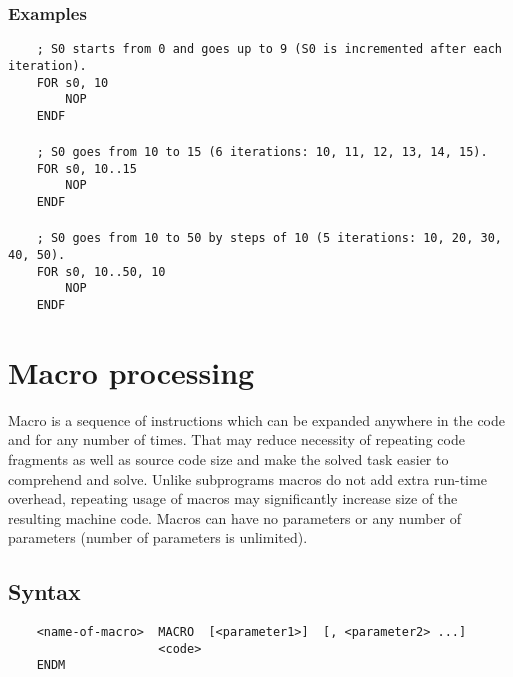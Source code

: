         \subsubsection{Examples}
            \verb'    ; S0 starts from 0 and goes up to 9 (S0 is incremented after each iteration).'\\
            \verb'    FOR s0, 10'\\
            \verb'        NOP'\\
            \verb'    ENDF'\\
            \verb''\\
            \verb'    ; S0 goes from 10 to 15 (6 iterations: 10, 11, 12, 13, 14, 15).'\\
            \verb'    FOR s0, 10..15'\\
            \verb'        NOP'\\
            \verb'    ENDF'\\
            \verb''\\
            \verb'    ; S0 goes from 10 to 50 by steps of 10 (5 iterations: 10, 20, 30, 40, 50).'\\
            \verb'    FOR s0, 10..50, 10'\\
            \verb'        NOP'\\
            \verb'    ENDF'

\clearpage
\section{Macro processing}
    Macro is a sequence of instructions which can be expanded anywhere in the code and for any number of times. That may reduce necessity of repeating code fragments as well as source code size and make the solved task easier to comprehend and solve. Unlike subprograms macros do not add extra run-time overhead, repeating usage of macros may significantly increase size of the resulting machine code. Macros can have no parameters or any number of parameters (number of parameters is unlimited).

    \subsection{Syntax}
        \verb'    <name-of-macro>  MACRO  [<parameter1>]  [, <parameter2> ...]'\\
        \verb'                     <code>'\\
        \verb'    ENDM'

